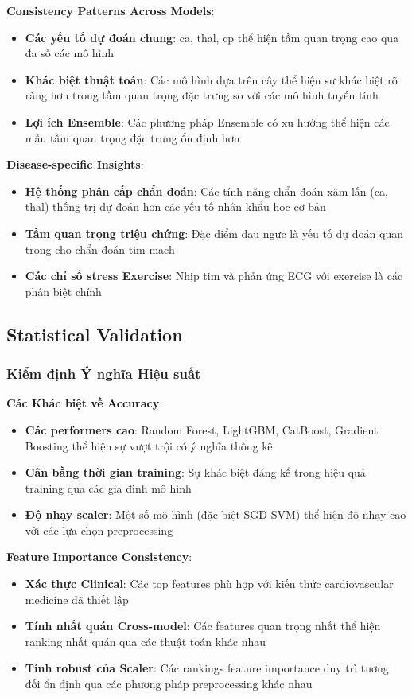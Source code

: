 \textbf{Consistency Patterns Across Models}:
\begin{itemize}
    \item \textbf{Các yếu tố dự đoán chung}: ca, thal, cp thể hiện tầm quan trọng cao qua đa số các mô hình
    \item \textbf{Khác biệt thuật toán}: Các mô hình dựa trên cây thể hiện sự khác biệt rõ ràng hơn trong tầm quan trọng đặc trưng so với các mô hình tuyến tính
    \item \textbf{Lợi ích Ensemble}: Các phương pháp Ensemble có xu hướng thể hiện các mẫu tầm quan trọng đặc trưng ổn định hơn
\end{itemize}

\textbf{Disease-specific Insights}:
\begin{itemize}
    \item \textbf{Hệ thống phân cấp chẩn đoán}: Các tính năng chẩn đoán xâm lấn (ca, thal) thống trị dự đoán hơn các yếu tố nhân khẩu học cơ bản
    \item \textbf{Tầm quan trọng triệu chứng}: Đặc điểm đau ngực là yếu tố dự đoán quan trọng cho chẩn đoán tim mạch
    \item \textbf{Các chỉ số stress Exercise}: Nhịp tim và phản ứng ECG với exercise là các phân biệt chính
\end{itemize}

\subsection{Statistical Validation}\label{subsec:detailed-statistical-validation}

\subsubsection{Kiểm định Ý nghĩa Hiệu suất}

\textbf{Các Khác biệt về Accuracy}:
\begin{itemize}
    \item \textbf{Các performers cao}: Random Forest, LightGBM, CatBoost, Gradient Boosting thể hiện sự vượt trội có ý nghĩa thống kê
    \item \textbf{Cân bằng thời gian training}: Sự khác biệt đáng kể trong hiệu quả training qua các gia đình mô hình
    \item \textbf{Độ nhạy scaler}: Một số mô hình (đặc biệt SGD SVM) thể hiện độ nhạy cao với các lựa chọn preprocessing
\end{itemize}

\textbf{Feature Importance Consistency}:
\begin{itemize}
    \item \textbf{Xác thực Clinical}: Các top features phù hợp với kiến thức cardiovascular medicine đã thiết lập
    \item \textbf{Tính nhất quán Cross-model}: Các features quan trọng nhất thể hiện ranking nhất quán qua các thuật toán khác nhau
    \item \textbf{Tính robust của Scaler}: Các rankings feature importance duy trì tương đối ổn định qua các phương pháp preprocessing khác nhau
\end{itemize}

